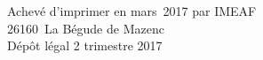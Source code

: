 \cleardoublepage
\mbox{}
\vfill

{\scriptsize
\begin{center}
Achevé d'imprimer en mars~2017 par IMEAF \\
26160~La Bégude de Mazenc \\[\baselineskip]

Dépôt légal\frcolon{} 2 trimestre 2017
\end{center}
}
\enlargethispage{\footskip}


